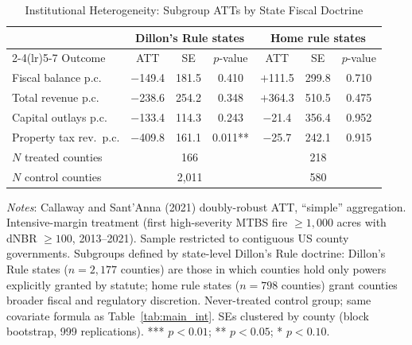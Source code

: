 \documentclass[12pt]{article}
\begin{document}
\clearpage


\begin{table}[h!]
\begin{threeparttable}
\caption{Institutional Heterogeneity: Subgroup ATTs by State Fiscal Doctrine}
\label{tab:home_rule}
\centering
\small
\begin{tabular}{lcccccc}
\toprule
 & \multicolumn{3}{c}{Dillon's Rule states} &
   \multicolumn{3}{c}{Home rule states} \\
\cmidrule(lr){2-4}\cmidrule(lr){5-7}
Outcome & ATT & SE & $p$-value & ATT & SE & $p$-value \\
\midrule
Fiscal balance p.c.       & $-$149.4 & 181.5 & 0.410   & $+$111.5 & 299.8 & 0.710 \\
Total revenue p.c.        & $-$238.6 & 254.2 & 0.348   & $+$364.3 & 510.5 & 0.475 \\
Capital outlays p.c.      & $-$133.4 & 114.3 & 0.243   & $-$21.4  & 356.4 & 0.952 \\
Property tax rev.\ p.c.   & $-$409.8 & 161.1 & 0.011** & $-$25.7  & 242.1 & 0.915 \\
\addlinespace
$N$ treated counties      & \multicolumn{3}{c}{166} & \multicolumn{3}{c}{218} \\
$N$ control counties      & \multicolumn{3}{c}{2{,}011} & \multicolumn{3}{c}{580} \\
\bottomrule
\end{tabular}
\begin{tablenotes}[flushleft]
\small
\item \textit{Notes}: Callaway and Sant'Anna (2021) doubly-robust ATT, ``simple''
aggregation. Intensive-margin treatment (first high-severity MTBS fire $\geq\!1{,}000$
acres with dNBR $\geq\!100$, 2013--2021). Sample restricted to contiguous US county
governments. Subgroups defined by state-level Dillon's Rule doctrine: Dillon's Rule
states ($n = 2{,}177$ counties) are those in which counties hold only powers
explicitly granted by statute; home rule states ($n = 798$ counties) grant counties
broader fiscal and regulatory discretion. Never-treated control group; same
covariate formula as Table~\ref{tab:main_int}. SEs clustered by county (block bootstrap,
999 replications). *** $p < 0.01$; ** $p < 0.05$; * $p < 0.10$.
\end{tablenotes}
\end{threeparttable}
\end{table}
\end{document}
